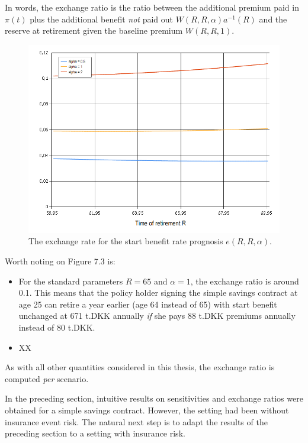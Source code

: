 \documentclass{article}
\newcommand{\1}[1]{\mathbbm{1}_{\left\lbrace #1 \right\rbrace}}
\theoremstyle{break}
\theoremstyle{remark}
\newenvironment{remark}
  {\pushQED{\qed}\renewcommand{\qedsymbol}{\scalebox{1.4}{$\circ$}}\remarkx}
  {\popQED\endremarkx}
\numberwithin{equation}{section}
\begin{document}
In words, the exchange ratio is the ratio between the additional premium paid in $\pi(t)$ plus the additional benefit \textit{not} paid out $W(R,R,\alpha) a^{-1}(R)$ and the reserve at retirement given the baseline premium $W(R,R,1)$.

\begin{figure}[H]
	\centering
	\caption{The exchange rate for the start benefit rate prognosis $e(R,R,\alpha)$.}
	\includegraphics[width=\textwidth]{Exchange}		
\end{figure}

Worth noting on Figure 7.3 is:

\begin{itemize}
	\item For the standard parameters $R=65$ and $\alpha=1$, the exchange ratio is around 0.1. This means that the policy holder signing the simple savings contract at age 25 can retire a year earlier (age 64 instead of 65) with start benefit unchanged at 671 t.DKK annually \textit{if} she pays 88 t.DKK premiums annually instead of 80 t.DKK.
	\item XX
\end{itemize}


\begin{remark}
	As with all other quantities considered in this thesis, the exchange ratio is computed \textit{per} scenario.
\end{remark}

In the preceding section, intuitive results on sensitivities and exchange ratios were obtained for a simple savings contract. However, the setting had been without insurance event risk. The natural next step is to adapt the results of the preceding section to a setting with insurance risk.
\end{document}
